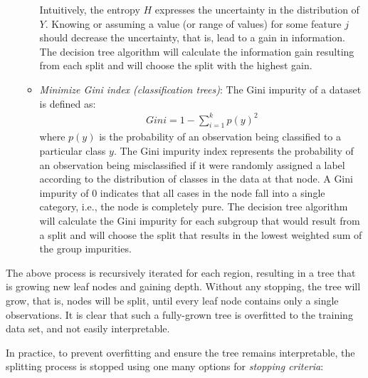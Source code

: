\begin{enumerate}
\begin{itemize}
       Intuitively, the entropy $H$ expresses the uncertainty in the distribution of $Y$. Knowing or assuming a value (or range of values) for some feature $j$ should decrease the uncertainty, that is, lead to a gain in information. The decision tree algorithm will calculate the information gain resulting from each split and will choose the split with the highest gain.
   \item \emph{Minimize Gini index (classification trees)}:
   The Gini impurity of a dataset is defined as:
\begin{align*}
Gini = 1 - \sum_{i=1}^k p(y)^2
\end{align*}
where $p(y)$ is the probability of an observation being classified to a particular class $y$. The Gini impurity index represents the probability of an observation being misclassified if it were randomly assigned a label according to the distribution of classes in the data at that node. A Gini impurity of 0 indicates that all cases in the node fall into a single category, i.e., the node is completely pure. The decision tree algorithm will calculate the Gini impurity for each subgroup that would result from a split and will choose the split that results in the lowest weighted sum of the group impurities.
\end{itemize}
\end{enumerate}

The above process is recursively iterated for each region, resulting in a tree that is growing new leaf nodes and gaining depth. Without any stopping, the tree will grow, that is, nodes will be split, until every leaf node contains only a single observations. It is clear that such a fully-grown tree is overfitted to the training data set, and not easily interpretable. 

In practice, to prevent overfitting and ensure the tree remains interpretable, the splitting process is stopped using one many options for \emph{stopping criteria}:

